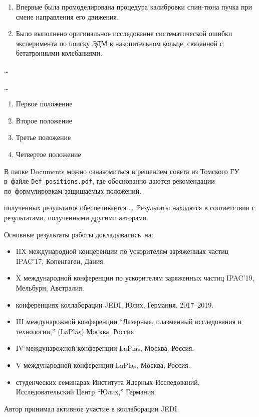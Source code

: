 {\novelty}
\begin{enumerate}
  \item Впервые была промоделирована процедура калибровки спин-тюна пучка при смене направления его движения. 
  \item Было выполнено оригинальное исследование систематической ошибки эксперимента по поиску ЭДМ в накопительном кольце, связанной с бетатронными колебаниями.
\end{enumerate}

{\influence} \ldots

{\methods} \ldots

{}
\begin{enumerate}
  \item Первое положение
  \item Второе положение
  \item Третье положение
  \item Четвертое положение
\end{enumerate}
В папке Documents можно ознакомиться в решением совета из Томского ГУ
в~файле \verb+Def_positions.pdf+, где обоснованно даются рекомендации
по~формулировкам защищаемых положений. 

{\reliability} полученных результатов обеспечивается \ldots \ Результаты находятся в соответствии с результатами, полученными другими авторами.


{\probation}
Основные результаты работы докладывались~на:
\begin{itemize}
\item IIX международной концеренции по ускорителям заряженных частиц IPAC'17, Копенгаген, Дания.
\item X международной конференции по ускорителям заряженных частиц IPAC'19, Мельбурн, Австралия.
\item конференциях коллаборации JEDI, Юлих, Германия, 2017--2019.
\item III междунарожной конференции ``Лазерные, плазменный исследования и технологии,'' (LaPlas) Москва, Россия. 
\item IV междунарожной конференции LaPlas, Москва, Россия.
\item V международной конференции LaPlas, Москва, Россия.
\item студенческих семинарах Института Ядерных Исследований, Исследовательский Центр ``Юлих,'' Германия.
\end{itemize}

{\contribution} Автор принимал активное участие в коллаборации JEDI.

